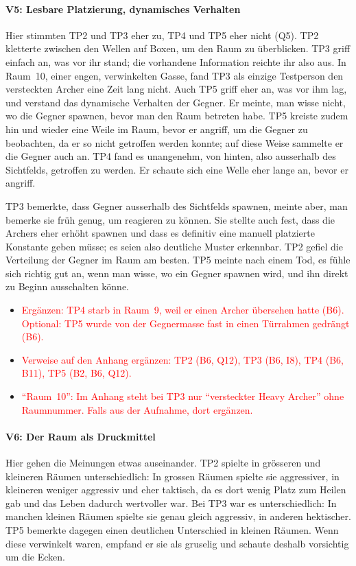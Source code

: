 \documentclass[../Main.tex]{subfiles}
\begin{document}
\paragraph{V5: Lesbare Platzierung, dynamisches Verhalten}
Hier stimmten TP2 und TP3 eher zu, TP4 und TP5 eher nicht (Q5). TP2 kletterte zwischen den Wellen auf Boxen, um den Raum zu überblicken. TP3 griff einfach an, was vor ihr stand; die vorhandene Information reichte ihr also aus. In Raum~10, einer engen, verwinkelten Gasse, fand TP3 als einzige Testperson den versteckten Archer eine Zeit lang nicht. Auch TP5 griff eher an, was vor ihm lag, und verstand das dynamische Verhalten der Gegner. Er meinte, man wisse nicht, wo die Gegner spawnen, bevor man den Raum betreten habe. TP5 kreiste zudem hin und wieder eine Weile im Raum, bevor er angriff, um die Gegner zu beobachten, da er so nicht getroffen werden konnte; auf diese Weise sammelte er die Gegner auch an. TP4 fand es unangenehm, von hinten, also ausserhalb des Sichtfelds, getroffen zu werden. Er schaute sich eine Welle eher lange an, bevor er angriff.

TP3 bemerkte, dass Gegner ausserhalb des Sichtfelds spawnen, meinte aber, man bemerke sie früh genug, um reagieren zu können. Sie stellte auch fest, dass die Archers eher erhöht spawnen und dass es definitiv eine manuell platzierte Konstante geben müsse; es seien also deutliche Muster erkennbar. TP2 gefiel die Verteilung der Gegner im Raum am besten. TP5 meinte nach einem Tod, es fühle sich richtig gut an, wenn man wisse, wo ein Gegner spawnen wird, und ihn direkt zu Beginn ausschalten könne.

\begin{itemize}[leftmargin=1.5cm]
    \item \textcolor{red}{Ergänzen: TP4 starb in Raum~9, weil er einen Archer übersehen hatte (B6). Optional: TP5 wurde von der Gegnermasse fast in einen Türrahmen gedrängt (B6).}
    \item \textcolor{red}{Verweise auf den Anhang ergänzen: TP2 (B6, Q12), TP3 (B6, I8), TP4 (B6, B11), TP5 (B2, B6, Q12).}
    \item \textcolor{red}{\enquote{Raum~10}: Im Anhang steht bei TP3 nur \enquote{versteckter Heavy Archer} ohne Raumnummer. Falls aus der Aufnahme, dort ergänzen.}
\end{itemize}

\paragraph{V6: Der Raum als Druckmittel}
Hier gehen die Meinungen etwas auseinander. TP2 spielte in grösseren und kleineren Räumen unterschiedlich: In grossen Räumen spielte sie aggressiver, in kleineren weniger aggressiv und eher taktisch, da es dort wenig Platz zum Heilen gab und das Leben dadurch wertvoller war. Bei TP3 war es unterschiedlich: In manchen kleinen Räumen spielte sie genau gleich aggressiv, in anderen hektischer. TP5 bemerkte dagegen einen deutlichen Unterschied in kleinen Räumen. Wenn diese verwinkelt waren, empfand er sie als gruselig und schaute deshalb vorsichtig um die Ecken.
\end{document}
